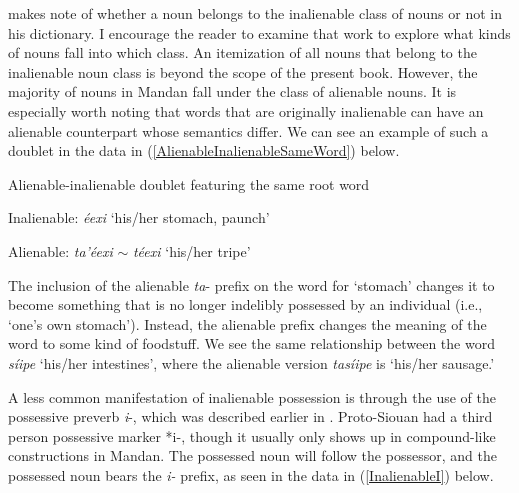 \citet{hollow1970} makes note of whether a noun belongs to the inalienable class of nouns or not in his dictionary. I encourage the reader to examine that work to explore what kinds of nouns fall into which class. An itemization of all nouns that belong to the inalienable noun class is beyond the scope of the present book. However, the majority of nouns in Mandan fall under the class of alienable nouns. It is especially worth noting that words that are originally inalienable can have an alienable counterpart whose semantics differ. We can see an example of such a doublet in the data in (\ref{AlienableInalienableSameWord}) below.

\begin{exe}
\item\label{AlienableInalienableSameWord} Alienable-inalienable doublet featuring the same root word

    \begin{xlist}
    
    \item\label{AlienableInalienableSameWord1}  Inalienable: \textit{éexi} `his/her stomach, paunch'

    \item\label{AlienableInalienableSameWord2}  Alienable: \textit{ta'éexi} $\sim$ \textit{téexi} `his/her tripe'
    
    \end{xlist}
\end{exe}

The inclusion of the alienable \textit{ta}- prefix on the word for `stomach' changes it to become something that is no longer indelibly possessed by an individual (i.e., `one's own stomach'). Instead, the alienable prefix changes the meaning of the word to some kind of foodstuff. We see the same relationship between the word \textit{síipe} `his/her intestines', where the alienable version \textit{tasíipe} is `his/her sausage.'

A less common manifestation of inalienable possession is through the use of the possessive preverb \textit{i}-, which was described earlier in . Proto-Siouan had a third person possessive marker *i-, though it usually only shows up in compound-like constructions in Mandan. The possessed noun will follow the possessor, and the possessed noun bears the \textit{i-} prefix, as seen in the data in (\ref{InalienableI}) below.

